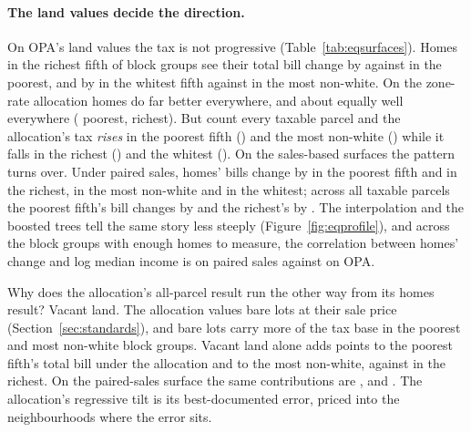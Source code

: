 \documentclass[11pt]{article}
\begin{document}
\paragraph{The land values decide the direction.} On OPA's land values the tax is not
progressive (Table~\ref{tab:eqsurfaces}). Homes in the richest fifth of block groups see their
total bill change by \LycdEqOpaEndsHomesRich{} against \LycdEqOpaEndsHomesPoor{} in the poorest,
and by \LycdEqOpaEndsHomesWhite{} in the whitest fifth against \LycdEqOpaEndsHomesNonwhite{} in the
most non-white. On the zone-rate allocation homes do far better everywhere, and about equally
well everywhere (\LycdEqLycdEndsHomesPoor{} poorest, \LycdEqLycdEndsHomesRich{} richest). But count
every taxable parcel and the allocation's tax \emph{rises} in the poorest fifth
(\LycdEqLycdEndsAllPoor{}) and the most non-white (\LycdEqLycdEndsAllNonwhite{}) while it falls in
the richest (\LycdEqLycdEndsAllRich{}) and the whitest (\LycdEqLycdEndsAllWhite{}). On the
sales-based surfaces the pattern turns over. Under paired sales, homes' bills change by
\LycdEqSfiveEndsHomesPoor{} in the poorest fifth and \LycdEqSfiveEndsHomesRich{} in the richest,
\LycdEqSfiveEndsHomesNonwhite{} in the most non-white and \LycdEqSfiveEndsHomesWhite{} in the
whitest; across all taxable parcels the poorest fifth's bill changes by
\LycdEqSfiveEndsAllPoor{} and the richest's by \LycdEqSfiveEndsAllRich{}. The interpolation and the
boosted trees tell the same story less steeply (Figure~\ref{fig:eqprofile}), and across
the \LycdEqBlockGroups{} block groups with enough homes to measure, the correlation between homes'
change and log median income is \LycdEqSfiveRInc{} on paired sales against \LycdEqOpaRInc{} on OPA.

Why does the allocation's all-parcel result run the other way from its homes result? Vacant
land. The allocation values bare lots at \LycdSalesLYCDAgg{} their sale price
(Section~\ref{sec:standards}), and bare lots carry more of the tax base in the poorest and most non-white
block groups. Vacant land alone adds \LycdEqLycdVacantPoor{} points to the poorest fifth's total
bill under the allocation and \LycdEqLycdVacantNonwhite{} to the most non-white, against
\LycdEqLycdVacantRich{} in the richest. On the paired-sales surface the same contributions are
\LycdEqSfiveVacantPoor{}, \LycdEqSfiveVacantNonwhite{} and \LycdEqSfiveVacantRich{}. The
allocation's regressive tilt is its best-documented error, priced into the neighbourhoods where
the error sits.

\begin{table}[t]
  \centering
  \caption{The same comparison under three treatments of the construction abatement, homes
  only. The last column is the lowest share of homes paying less in any income, non-white-share
  or Black-share group.}
  \label{tab:eqabatement}
  {\small}
\end{table}
\end{document}
